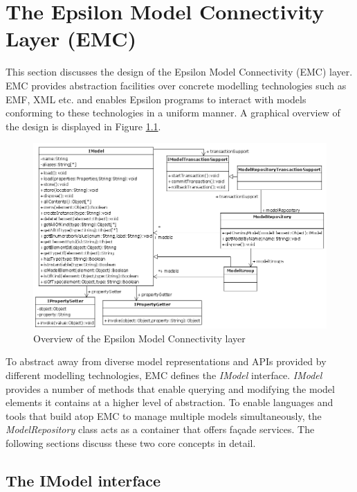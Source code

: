 \chapter{The Epsilon Model Connectivity Layer (EMC)}
\label{sec:Design.EMC}

This section discusses the design of the Epsilon Model Connectivity (EMC) layer. EMC provides abstraction facilities over concrete modelling technologies such as EMF, XML etc. and enables Epsilon programs to interact with models conforming to these technologies in a uniform manner. A graphical overview of the design is displayed in Figure \ref{fig:EMC}.


\begin{figure}
	\centering
		\includegraphics{images/EMC.png}
	\caption{Overview of the Epsilon Model Connectivity layer}
	\label{fig:EMC}
\end{figure}


To abstract away from diverse model representations and APIs provided by different modelling technologies, EMC defines the \emph{IModel} interface. \emph{IModel} provides a number of methods that enable querying and modifying the model elements it contains at a higher level of abstraction. To enable languages and tools that build atop EMC to manage multiple models simultaneously, the \emph{ModelRepository} class acts as a container that offers fa\c{c}ade services. The following sections discuss these two core concepts in detail.

\section{The IModel interface}

